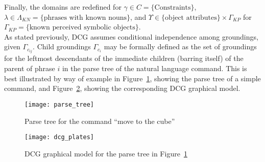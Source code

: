 Finally, the domains are redefined for $\gamma \in C=\{\text{Constraints}\}$, $\lambda \in \Lambda_{KN}=\{\text{phrases with known nouns}\}$, and $\Upsilon \in \{\text{object attributes}\} \times \Gamma_{KP}$ for $\Gamma_{KP} = \{\text{known perceived symbolic objects}\}$.\\
\indent As stated previously, DCG assumes conditional independence among groundings, given $\Gamma_{c_{ij}}$.
Child groundings $\Gamma_{c_i}$ may be formally defined as the set of groundings for the leftmost descendants of the immediate children (barring itself) of the parent of phrase $i$ in the parse tree of the natural language command.
This is best illustrated by way of example in Figure~\ref{fig:parse_tree}, showing the parse tree of a simple command, and Figure~\ref{fig:dcg_plates}, showing the corresponding DCG graphical model. 

\begin{figure}
\centering
\texttt{[image: parse\_tree]}
\label{fig:parse_tree}
\caption{Parse tree for the command ``move to the cube''}
\end{figure}

\begin{figure}
\centering
\texttt{[image: dcg\_plates]}
\label{fig:dcg_plates}
\caption{DCG graphical model for the parse tree in Figure~\ref{fig:parse_tree}}
\end{figure}

